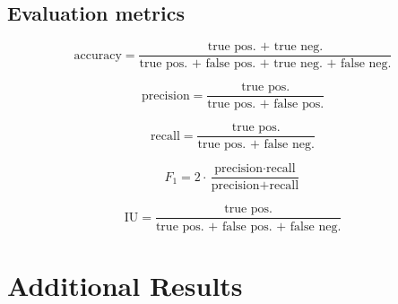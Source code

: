 \subsection{Evaluation metrics}

$$ \text{accuracy} = \frac{\text{true pos. + true neg.}}{\text{true pos. + false pos. + true neg. + false neg.}}$$

$$\text{precision} = \frac{\text{true pos.}}{\text{true pos. + false pos.}}$$

$$\text{recall} = \frac{\text{true pos.}}{\text{true pos. + false neg.}}$$

$$F_1 = 2 \cdot \frac{\text{precision} \cdot \text{recall}}{\text{precision}+\text{recall}}$$

$$ \text{IU} = \frac{\text{true pos.}}{\text{true pos. + false pos. + false neg.}}$$




\section{Additional Results}
\label{sec:addition}

